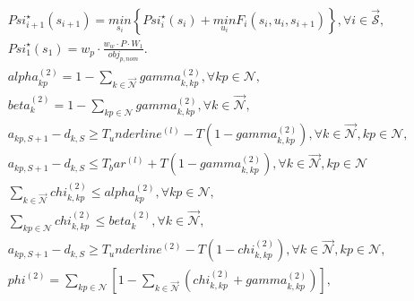 \begin{align}
  & \mathit{Psi}_{i + 1}^{\star} \left(s_{i + 1}\right) = \underset{s_{i}}{min} \left\{\mathit{Psi}_{i}^{\star} \left(s_{i}\right) + \underset{u_{i}}{min} F_{i} \left(s_{i} , u_{i} , s_{i + 1}\right)\right\} , \forall i \in \vec{\mathcal{S}} , \tag{eq\_0044} \\
  & \mathit{Psi}_{1}^{\star} \left(s_{1}\right) = w_{p} \cdot \frac{w_{w} \cdot P \cdot W_{1}}{\mathit{obj}_{p , n o m}} . \tag{eq\_0045} \\
  & \mathit{alpha}_{kp}^{\left(2\right)} = 1 - \underset{k \in \vec{\mathcal{N}}}{\sum} \mathit{gamma}_{k , kp}^{\left(2\right)} , \forall kp \in {\mathcal{N}} , \tag{eq\_0051} \\
  & \mathit{beta}_{k}^{\left(2\right)} = 1 - \underset{kp \in {\mathcal{N}}}{\sum} \mathit{gamma}_{k , kp}^{\left(2\right)} , \forall k \in \vec{\mathcal{N}} , \tag{eq\_0052} \\
  & a_{kp , S + 1} - d_{k , S} \geq T_underline^{\left(l\right)} - T \left(1 - \mathit{gamma}_{k , kp}^{\left(2\right)}\right) , \forall k \in \vec{\mathcal{N}} , kp \in {\mathcal{N}} , \tag{eq\_0053} \\
  & a_{kp , S + 1} - d_{k , S} \leq T_bar^{\left(l\right)} + T \left(1 - \mathit{gamma}_{k , kp}^{\left(2\right)}\right) , \forall k \in \vec{\mathcal{N}} , kp \in {\mathcal{N}} \tag{eq\_0054} \\
  & \underset{k \in \vec{\mathcal{N}}}{\sum} \mathit{chi}_{k , kp}^{\left(2\right)} \leq \mathit{alpha}_{kp}^{\left(2\right)} , \forall kp \in {\mathcal{N}} , \tag{eq\_0055} \\
  & \underset{kp \in {\mathcal{N}}}{\sum} \mathit{chi}_{k , kp}^{\left(2\right)} \leq \mathit{beta}_{k}^{\left(2\right)} , \forall k \in \vec{\mathcal{N}} , \tag{eq\_0056} \\
  & a_{kp , S + 1} - d_{k , S} \geq T_underline^{\left(2\right)} - T \left(1 - \mathit{chi}_{k , kp}^{\left(2\right)}\right) , \forall k \in \vec{\mathcal{N}} , kp \in {\mathcal{N}} , \tag{eq\_0057} \\
  & \mathit{phi}^{\left(2\right)} = \underset{kp \in {\mathcal{N}}}{\sum} \left[1 - \underset{k \in \vec{\mathcal{N}}}{\sum} \left(\mathit{chi}_{k , kp}^{\left(2\right)} + \mathit{gamma}_{k , kp}^{\left(2\right)}\right)\right] , \tag{eq\_0058} \\
\end{align}
